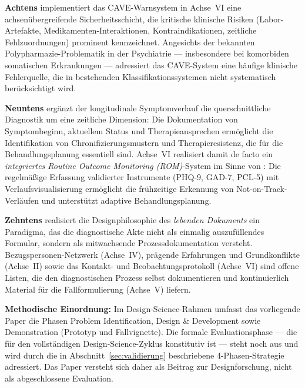 \documentclass[11pt,a4paper]{article}
\begin{document}
\textbf{Achtens} implementiert das CAVE-Warnsystem in Achse~VI eine achsen\"ubergreifende Sicherheitsschicht, die kritische klinische Risiken (Labor-Artefakte, Medikamenten-Interaktionen, Kontraindikationen, zeitliche Fehlzuordnungen) prominent kennzeichnet. Angesichts der bekannten Polypharmazie-Problematik in der Psychiatrie --- insbesondere bei komorbiden somatischen Erkrankungen --- adressiert das CAVE-System eine h\"aufige klinische Fehlerquelle, die in bestehenden Klassifikationssystemen nicht systematisch ber\"ucksichtigt wird.

\textbf{Neuntens} erg\"anzt der longitudinale Symptomverlauf die querschnittliche Diagnostik um eine zeitliche Dimension: Die Dokumentation von Symptombeginn, aktuellem Status und Therapieansprechen erm\"oglicht die Identifikation von Chronifizierungsmustern und Therapieresistenz, die f\"ur die Behandlungsplanung essentiell sind. Achse~VI realisiert damit de facto ein \textit{integriertes Routine Outcome Monitoring (ROM)}-System im Sinne von \citet{Barkham2023}: Die regelm\"a\ss{}ige Erfassung validierter Instrumente (PHQ-9, GAD-7, PCL-5) mit Verlaufsvisualisierung erm\"oglicht die fr\"uhzeitige Erkennung von Not-on-Track-Verl\"aufen und unterst\"utzt adaptive Behandlungsplanung.

\textbf{Zehntens} realisiert die Designphilosophie des \textit{lebenden Dokuments} ein Paradigma, das die diagnostische Akte nicht als einmalig auszuf\"ullendes Formular, sondern als mitwachsende Prozessdokumentation versteht. Bezugspersonen-Netzwerk (Achse~IV), pr\"agende Erfahrungen und Grundkonflikte (Achse~II) sowie das Kontakt- und Beobachtungsprotokoll (Achse~VI) sind offene Listen, die den diagnostischen Prozess selbst dokumentieren und kontinuierlich Material f\"ur die Fallformulierung (Achse~V) liefern.

\vspace{0.5em}
\textbf{Methodische Einordnung:} Im Design-Science-Rahmen \citep{Hevner2004, Peffers2007} umfasst das vorliegende Paper die Phasen Problem Identification, Design \& Development sowie Demonstration (Prototyp und Fallvignette). Die formale Evaluationsphase --- die f\"ur den vollst\"andigen Design-Science-Zyklus konstitutiv ist --- steht noch aus und wird durch die in Abschnitt~\ref{sec:validierung} beschriebene 4-Phasen-Strategie adressiert. Das Paper versteht sich daher als Beitrag zur Designforschung, nicht als abgeschlossene Evaluation.
\end{document}
